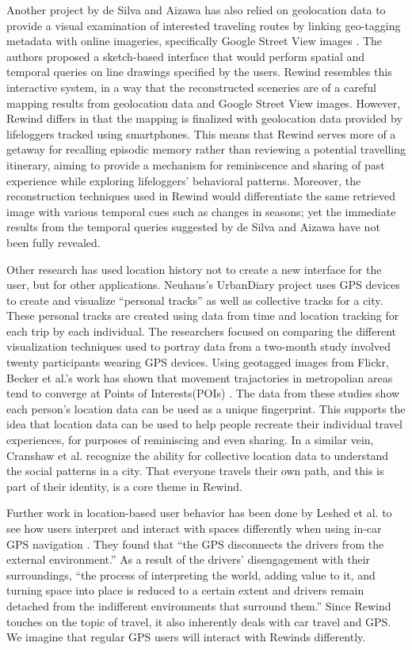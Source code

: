 \documentclass{sigchi}
\begin{document}
Another project by de Silva and Aizawa has also relied on geolocation data to provide a visual examination of interested traveling routes by linking geo-tagging metadata with online imageries, specifically Google Street View images \cite{deSilva:2009:RMT:1631272.1631414}. The authors proposed a sketch-based interface that would perform spatial and temporal queries on line drawings specified by the users. Rewind resembles this interactive system, in a way that the reconstructed sceneries are of a careful mapping results from geolocation data and Google Street View images. However, Rewind differs in that the mapping is finalized with geolocation data provided by lifeloggers tracked using smartphones. This means that Rewind serves more of a getaway for recalling episodic memory rather than reviewing a potential travelling itinerary, aiming to provide a mechanism for reminiscence and sharing of past experience while exploring lifeloggers' behavioral patterns. Moreover, the reconstruction techniques used in Rewind would differentiate the same retrieved image with various temporal cues such as changes in seasons; yet the immediate results from the temporal queries suggested by de Silva and Aizawa have not been fully revealed. 

Other research has used location history not to create a new interface for the user, but for other applications. Neuhaus's UrbanDiary project \cite{neuhaus2010urbandiary} uses GPS devices to create and visualize ``personal tracks'' as well as collective tracks for a city. These personal tracks are created using data from time and location tracking for each trip by each individual. The researchers focused on comparing the different visualization techniques used to portray data from a two-month study involved twenty participants wearing GPS devices. Using geotagged images from Flickr, Becker et al.'s work has shown that movement trajactories in metropolian areas tend to converge at Points of Interests(POIs) \cite{Becker2015}. The data from these studies show each person's location data can be used as a unique fingerprint. This supports the idea that location data can be used to help people recreate their individual travel experiences, for purposes of reminiscing and even sharing. In a similar vein, Cranshaw et al. \cite{cranshaw2012livehoods} recognize the ability for collective location data to understand the social patterns in a city. That everyone travels their own path, and this is part of their identity, is a core theme in Rewind.

Further work in location-based user behavior has been done by Leshed et al. to see how users interpret and interact with spaces differently when using in-car GPS navigation \cite{leshed2008car}. They found that ``the GPS disconnects the drivers from the external environment.'' As a result of the drivers' disengagement with their surroundings, ``the process of interpreting the world, adding value to it, and turning space into place is reduced to a certain extent and drivers remain detached from the indifferent environments that surround them.'' Since Rewind touches on the topic of travel, it also inherently deals with car travel and GPS. We imagine that regular GPS users will interact with Rewinds differently.
\end{document}
